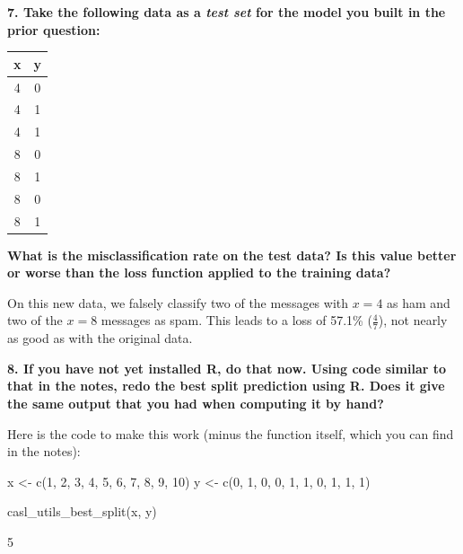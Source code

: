 \documentclass[12pt,hidelinks]{article}
\numberwithin{equation}{section}
\begin{document}
\vspace*{12pt}

\textbf{7. Take the following data as a \textit{test set} for the model you built
in the prior question:}

\begin{center}
\begin{tabular}{cc}
x & y \\ \hline
4 & 0 \\
4 & 1 \\
4 & 1 \\
8 & 0 \\
8 & 1 \\
8 & 0 \\
8 & 1 \\
\end{tabular}
\end{center}

\textbf{What is the misclassification rate on the test data? Is this value better or
worse than the loss function applied to the training data?}

\vspace*{12pt}

On this new data, we falsely classify two of the messages with $x=4$ as ham
and two of the $x=8$ messages as spam. This leads to a loss of 57.1\% ($\frac{4}{7}$),
not nearly as good as with the original data.

\vspace*{12pt}

\textbf{8. If you have not yet installed R, do that now. Using code similar to
that in the notes, redo the best split prediction using R. Does it give the
same output that you had when computing it by hand?}

\vspace*{12pt}

Here is the code to make this work (minus the function itself, which you can
find in the notes):


\begin{rcode}
x <- c(1, 2, 3, 4, 5, 6, 7, 8, 9, 10)
y <- c(0, 1, 0, 0, 1, 1, 0, 1, 1, 1)

casl_utils_best_split(x, y)
\end{rcode}
\begin{rres}
[1] 5
\end{rres}
\end{document}
